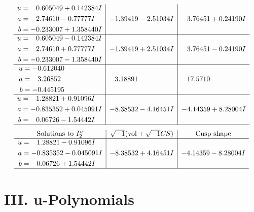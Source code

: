 \documentclass[1p]{elsarticle_modified}
\theoremstyle{definition}
\newcommand{\I}{\sqrt{-1}}
\begin{document}
$$\begin{array}{c|c|c}
\begin{aligned}
u &= \phantom{-}0.605049 + 0.142384 I \\
a &= \phantom{-}2.74610 - 0.77777 I \\
b &= -0.233007 + 1.358440 I\end{aligned}
 & -1.39419 - 2.51034 I & \phantom{-}3.76451 + 0.24190 I \\ \hline\begin{aligned}
u &= \phantom{-}0.605049 - 0.142384 I \\
a &= \phantom{-}2.74610 + 0.77777 I \\
b &= -0.233007 - 1.358440 I\end{aligned}
 & -1.39419 + 2.51034 I & \phantom{-}3.76451 - 0.24190 I \\ \hline\begin{aligned}
u &= -0.612040\phantom{ +0.000000I} \\
a &= \phantom{-}3.26852\phantom{ +0.000000I} \\
b &= -0.445195\phantom{ +0.000000I}\end{aligned}
 & \phantom{-}3.18891\phantom{ +0.000000I} & \phantom{-}17.5710\phantom{ +0.000000I} \\ \hline\begin{aligned}
u &= \phantom{-}1.28821 + 0.91096 I \\
a &= -0.835352 + 0.045091 I \\
b &= \phantom{-}0.06726 - 1.54442 I\end{aligned}
 & -8.38532 - 4.16451 I & -4.14359 + 8.28004 I\\
 \hline 
 \end{array}$$\newpage$$\begin{array}{c|c|c}  
\text{Solutions to }I^u_{2}& \I (\text{vol} + \sqrt{-1}CS) & \text{Cusp shape}\\
 \hline 
\begin{aligned}
u &= \phantom{-}1.28821 - 0.91096 I \\
a &= -0.835352 - 0.045091 I \\
b &= \phantom{-}0.06726 + 1.54442 I\end{aligned}
 & -8.38532 + 4.16451 I & -4.14359 - 8.28004 I\\
 \hline 
 \end{array}$$\newpage
\newpage\renewcommand{\arraystretch}{1}
\centering \section*{ III. u-Polynomials}
\end{document}
